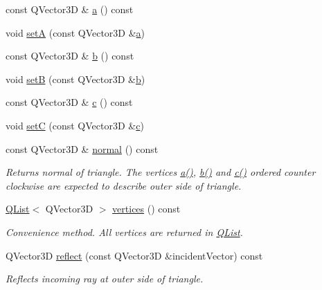 \begin{DoxyCompactItemize}
\item 
const Q\+Vector3\+D \& \hyperlink{class_triangle_a430bf0a9d8eaf20ea7bdefcd8082588c}{a} () const 
\item 
void \hyperlink{class_triangle_a24c012d83d7e6c5d0b27985d8dcb64da}{set\+A} (const Q\+Vector3\+D \&\hyperlink{class_triangle_a430bf0a9d8eaf20ea7bdefcd8082588c}{a})
\item 
const Q\+Vector3\+D \& \hyperlink{class_triangle_a8327124c9b9b752be94187c9fbf3f460}{b} () const 
\item 
void \hyperlink{class_triangle_a9f889b49a5ea3b4be4c4366c63673095}{set\+B} (const Q\+Vector3\+D \&\hyperlink{class_triangle_a8327124c9b9b752be94187c9fbf3f460}{b})
\item 
const Q\+Vector3\+D \& \hyperlink{class_triangle_a61f6c0245df276555de6d1b1a98840b8}{c} () const 
\item 
void \hyperlink{class_triangle_af4566995b306c0f9ae72b457b7acb983}{set\+C} (const Q\+Vector3\+D \&\hyperlink{class_triangle_a61f6c0245df276555de6d1b1a98840b8}{c})
\item 
const Q\+Vector3\+D \& \hyperlink{class_triangle_aa1ccf6af0c2567e53b9dc6f51243f934}{normal} () const 
\begin{DoxyCompactList}\small\item\em Returns normal of triangle. The vertices \hyperlink{class_triangle_a430bf0a9d8eaf20ea7bdefcd8082588c}{a()}, \hyperlink{class_triangle_a8327124c9b9b752be94187c9fbf3f460}{b()} and \hyperlink{class_triangle_a61f6c0245df276555de6d1b1a98840b8}{c()} ordered counter clockwise are expected to describe outer side of triangle. \end{DoxyCompactList}\item 
\hyperlink{singleton_q_list}{Q\+List}$<$ Q\+Vector3\+D $>$ \hyperlink{class_triangle_a66da12d2c747c435ea5148df472d9229}{vertices} () const 
\begin{DoxyCompactList}\small\item\em Convenience method. All vertices are returned in \hyperlink{singleton_q_list}{Q\+List}. \end{DoxyCompactList}\item 
Q\+Vector3\+D \hyperlink{class_triangle_a4fb81ac7e355c97a03f4c056bd79ac99}{reflect} (const Q\+Vector3\+D \&incident\+Vector) const 
\begin{DoxyCompactList}\small\item\em Reflects incoming ray at outer side of triangle. \end{DoxyCompactList}\end{DoxyCompactItemize}
